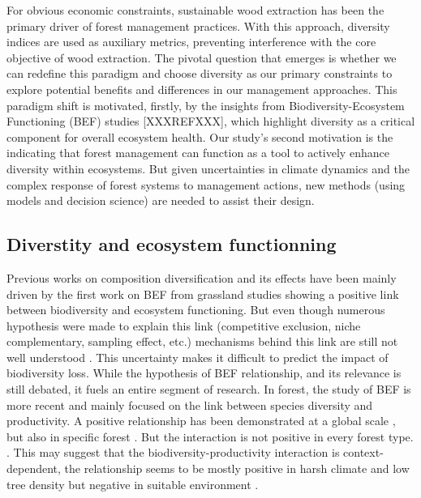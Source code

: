 \documentclass{article}
\begin{document}
For obvious economic constraints, sustainable wood extraction has been the primary driver of forest management practices. With this approach, diversity indices are used as auxiliary metrics, preventing interference with the core objective of wood extraction. The pivotal question that emerges is whether we can redefine this paradigm and choose diversity as our primary constraints to explore potential benefits and differences in our management approaches. This paradigm shift is motivated, firstly, by the insights from Biodiversity-Ecosystem Functioning (BEF) studies [XXXREFXXX], which highlight diversity as a critical component for overall ecosystem health. Our study's second motivation is the indicating that forest management can function as a tool to actively enhance diversity within ecosystems. But given uncertainties in climate dynamics and the complex response of forest systems to management actions, new methods (using models and decision science) are needed to assist their design.

\subsection{Diverstity and ecosystem functionning}

Previous works on composition diversification and its effects have been mainly driven by the first work on BEF from grassland studies \autocite{tilmanBiodiversityPopulationEcosystem1996} showing a positive link between biodiversity and ecosystem functioning. But even though numerous hypothesis were made to explain this link (competitive exclusion, niche complementary, sampling effect, etc.) mechanisms behind this link are still not well understood \autocite{aliBiodiversityEcosystemFunctioning2023}. This uncertainty makes it difficult to predict the impact of biodiversity loss.
While the hypothesis of BEF relationship, and its relevance is still debated, it fuels an entire segment of research.
In forest, the study of BEF is more recent and mainly focused on the link between species diversity and productivity. A positive relationship has been demonstrated at a global scale \autocite{liangPositiveBiodiversityproductivityRelationship2016}, but also in specific forest \autocite{morinTreeSpeciesRichness2011,paquetteEffectBiodiversityTree2011,jourdanManagingMixedStands2021}. But the interaction is not positive in every forest type. \autocite{forresterReviewProcessesDiversity2016}.
This may suggest that the biodiversity-productivity interaction is context-dependent, the relationship seems to be mostly positive in harsh climate and low tree density but negative in suitable environment \autocite{juckerClimateModulatesEffects2016}.
\end{document}
